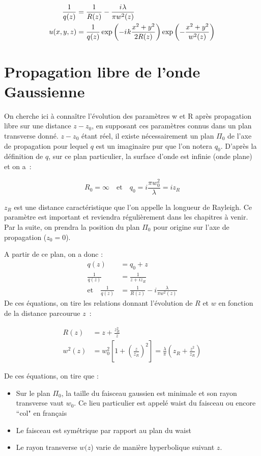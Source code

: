 \documentclass[a4paper]{book}
\newcommand{\iu}{{i\mkern1mu}}
\begin{document}
\begin{align}
    \frac{1}{q(z)}&=\frac{1}{R(z)}-\frac{\iu \lambda}{\pi w^2(z)}\\
    u(x,y,z)&=\frac{1}{q(z)}\exp\left(-\iu k \frac{x^2 + y^2}{2R(z)}\right)\exp\left(-\frac{x^2 + y^2}{w^2(z)}\right)
\end{align}
    


\section{Propagation libre de l'onde Gaussienne}

On cherche ici à connaître l'évolution des paramètres w et R après propagation libre sur une distance $z-z_0$, en supposant ces paramètres connus dans un plan transverse donné. $z-z_0$ étant réel, il existe nécessairement un plan $\Pi_0$ de l'axe de propagation pour lequel $q$ est un imaginaire pur que l'on notera $q_0$. D'après la définition de $q$, sur ce plan particulier, la surface d'onde est infinie (onde plane) et on a~:

\begin{equation}
    R_0 = \infty \quad \textrm{et} \quad q_0=i\frac{\pi w_0^2}{\lambda} = iz_R
\end{equation}

$z_R$ est une distance caractéristique que l'on appelle la longueur de Rayleigh. Ce paramètre est important et reviendra régulièrement dans les chapitres à venir.
Par la suite, on prendra la position du plan $\Pi_0$ pour origine sur l'axe de propagation ($z_0=0$).

A partir de ce plan, on a donc :
\begin{align}
    q(z) &= q_0+z\\
    \frac{1}{q(z)}&=\frac{1}{z+iz_R}\\
    \textrm{et} \quad \frac{1}{q(z)}&=\frac{1}{R(z)}-i\frac{\lambda}{\pi w^2(z)}
\end{align}
De ces équations, on tire les relations donnant l'évolution de $R$ et $w$ en fonction de la distance parcourue $z$~:

\begin{align}
  R(z) &= z + \frac{z_R^2}{z}\\
  w^2(z)&= w_0^2\left[1+\left(\frac{z}{z_R}\right)^2\right]  = \frac{\lambda}{\pi}\left(z_R+\frac{z^2}{z_R}\right)
\end{align}

De ces équations, on tire que :
\begin{itemize}
    \item Sur le plan $\Pi_0$, la taille du faisceau gaussien est minimale et son rayon transverse vaut $w_0$. Ce lieu particulier est appelé waist du faisceau ou encore  ``col" en français
    \item Le faisceau est symétrique par rapport au plan du waist
    \item Le rayon transverse $w(z$) varie de manière hyperbolique suivant $z$.
\end{itemize}
\end{document}
